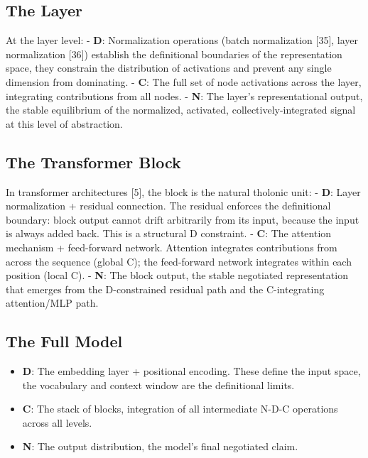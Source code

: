 \documentclass[12pt]{article}
\providecommand{\tightlist}{%
  \setlength{\itemsep}{0pt}\setlength{\parskip}{0pt}}
\begin{document}
\subsection{The Layer}\label{the-layer}

At the layer level: - \textbf{D}: Normalization operations (batch
normalization {[}35{]}, layer normalization {[}36{]}) establish the
definitional boundaries of the representation space, they constrain the
distribution of activations and prevent any single dimension from
dominating. - \textbf{C}: The full set of node activations across the
layer, integrating contributions from all nodes. - \textbf{N}: The
layer's representational output, the stable equilibrium of the
normalized, activated, collectively-integrated signal at this level of
abstraction.

\subsection{The Transformer Block}\label{the-transformer-block}

In transformer architectures {[}5{]}, the block is the natural tholonic
unit: - \textbf{D}: Layer normalization + residual connection. The
residual enforces the definitional boundary: block output cannot drift
arbitrarily from its input, because the input is always added back. This
is a structural D constraint. - \textbf{C}: The attention mechanism +
feed-forward network. Attention integrates contributions from across the
sequence (global C); the feed-forward network integrates within each
position (local C). - \textbf{N}: The block output, the stable
negotiated representation that emerges from the D-constrained residual
path and the C-integrating attention/MLP path.

\subsection{The Full Model}\label{the-full-model}

\begin{itemize}
\tightlist
\item
  \textbf{D}: The embedding layer + positional encoding. These define
  the input space, the vocabulary and context window are the
  definitional limits.
\item
  \textbf{C}: The stack of blocks, integration of all intermediate N-D-C
  operations across all levels.
\item
  \textbf{N}: The output distribution, the model's final negotiated
  claim.
\end{itemize}
\end{document}
